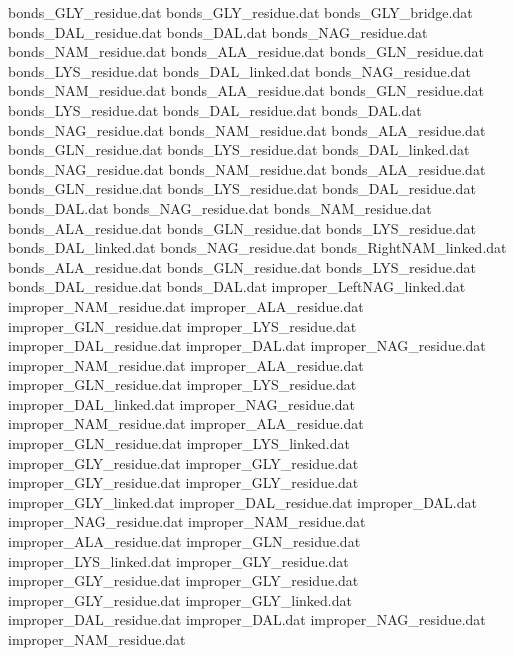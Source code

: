 bonds_GLY_residue.dat
bonds_GLY_residue.dat
bonds_GLY_bridge.dat
bonds_DAL_residue.dat           
bonds_DAL.dat                   
bonds_NAG_residue.dat           
bonds_NAM_residue.dat           
bonds_ALA_residue.dat           
bonds_GLN_residue.dat           
bonds_LYS_residue.dat           
bonds_DAL_linked.dat            
bonds_NAG_residue.dat           
bonds_NAM_residue.dat           
bonds_ALA_residue.dat           
bonds_GLN_residue.dat           
bonds_LYS_residue.dat           
bonds_DAL_residue.dat           
bonds_DAL.dat                   
bonds_NAG_residue.dat           
bonds_NAM_residue.dat           
bonds_ALA_residue.dat           
bonds_GLN_residue.dat           
bonds_LYS_residue.dat           
bonds_DAL_linked.dat            
bonds_NAG_residue.dat           
bonds_NAM_residue.dat           
bonds_ALA_residue.dat           
bonds_GLN_residue.dat           
bonds_LYS_residue.dat           
bonds_DAL_residue.dat           
bonds_DAL.dat                   
bonds_NAG_residue.dat           
bonds_NAM_residue.dat           
bonds_ALA_residue.dat           
bonds_GLN_residue.dat           
bonds_LYS_residue.dat           
bonds_DAL_linked.dat            
bonds_NAG_residue.dat           
bonds_RightNAM_linked.dat       
bonds_ALA_residue.dat           
bonds_GLN_residue.dat           
bonds_LYS_residue.dat           
bonds_DAL_residue.dat           
bonds_DAL.dat                   
improper_LeftNAG_linked.dat     
improper_NAM_residue.dat        
improper_ALA_residue.dat        
improper_GLN_residue.dat        
improper_LYS_residue.dat        
improper_DAL_residue.dat        
improper_DAL.dat                
improper_NAG_residue.dat        
improper_NAM_residue.dat        
improper_ALA_residue.dat        
improper_GLN_residue.dat        
improper_LYS_residue.dat        
improper_DAL_linked.dat         
improper_NAG_residue.dat        
improper_NAM_residue.dat        
improper_ALA_residue.dat        
improper_GLN_residue.dat        
improper_LYS_linked.dat         
improper_GLY_residue.dat
improper_GLY_residue.dat
improper_GLY_residue.dat
improper_GLY_residue.dat
improper_GLY_linked.dat
improper_DAL_residue.dat        
improper_DAL.dat                
improper_NAG_residue.dat        
improper_NAM_residue.dat        
improper_ALA_residue.dat        
improper_GLN_residue.dat        
improper_LYS_linked.dat         
improper_GLY_residue.dat
improper_GLY_residue.dat
improper_GLY_residue.dat
improper_GLY_residue.dat
improper_GLY_linked.dat
improper_DAL_residue.dat        
improper_DAL.dat                
improper_NAG_residue.dat        
improper_NAM_residue.dat        

